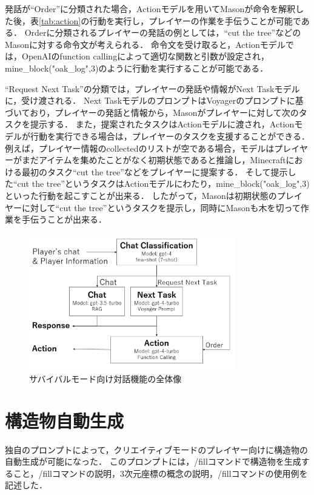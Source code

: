 発話が``Order''に分類された場合，Actionモデルを用いてMasonが命令を解釈した後，表\ref{tab:action}の行動を実行し，プレイヤーの作業を手伝うことが可能である．
Orderに分類されるプレイヤーの発話の例としては，``cut the tree''などのMasonに対する命令文が考えられる．
命令文を受け取ると，Actionモデルでは，OpenAIのfunction calling\cite{bib:function_calling}によって適切な関数と引数が設定され，mine\_block("oak\_log",3)のように行動を実行することが可能である．

``Request Next Task''の分類では，プレイヤーの発話や情報がNext Taskモデルに，受け渡される．
Next TaskモデルのプロンプトはVoyager\cite{bib:voyager}のプロンプトに基づいており，プレイヤーの発話と情報から，Masonがプレイヤーに対して次のタスクを提示する．
また，提案されたタスクはActionモデルに渡され，Actionモデルが行動を実行できる場合は，プレイヤーのタスクを支援することができる．
例えば，プレイヤー情報のcollectedのリストが空である場合，モデルはプレイヤーがまだアイテムを集めたことがなく初期状態であると推論し，Minecraftにおける最初のタスク``cut the tree''などをプレイヤーに提案する．
そして提示した``cut the tree''というタスクはActionモデルにわたり，mine\_block("oak\_log",3)といった行動を起こすことが出来る．
したがって，Masonは初期状態のプレイヤーに対して``cut the tree''というタスクを提示し，同時にMasonも木を切って作業を手伝うことが出来る．

\begin{figure}[H]
    \centering
    \includegraphics[width=0.8\textwidth]{fig/interactive_function.PNG}
    \caption{サバイバルモード向け対話機能の全体像}
    \label{fig:interactive_function}
\end{figure}

\section{構造物自動生成}\label{sec:build_mode}
独自のプロンプトによって，クリエイティブモードのプレイヤー向けに構造物の自動生成が可能になった．
このプロンプトには，/fillコマンドで構造物を生成すること，/fillコマンドの説明，3次元座標の概念の説明，/fillコマンドの使用例を記述した．

